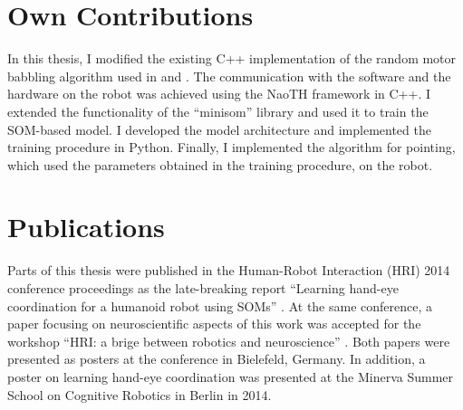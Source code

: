 \section{Own Contributions}
In this thesis, I modified the existing C++ implementation of the random motor 
babbling algorithm used in \citep{SchillaciH11} and \citep{Hafner2011}.
The communication with the software and the hardware on the robot was achieved 
using the NaoTH framework \citep{tdp10} in C++.
I extended the functionality of the ``minisom'' library \citep{minisom} and used it 
to train the SOM-based model. I developed the model architecture and 
implemented the training procedure in Python. 
Finally, I implemented the algorithm for pointing, which used the parameters 
obtained in the training procedure, on the robot.

\section{Publications}
Parts of this thesis were published in the Human-Robot Interaction (HRI) 2014 conference proceedings as the late-breaking report ``Learning hand-eye coordination for a humanoid robot using SOMs'' \citep{KajicSBH14}. At the same conference, a paper focusing on neuroscientific aspects of this work was accepted for the workshop ``HRI: a brige between robotics and neuroscience'' \citep{KajicWS14}. Both papers were presented as posters at the conference in Bielefeld, Germany. In addition, a poster on learning hand-eye coordination was presented at the Minerva Summer School on Cognitive Robotics in Berlin in 2014.

